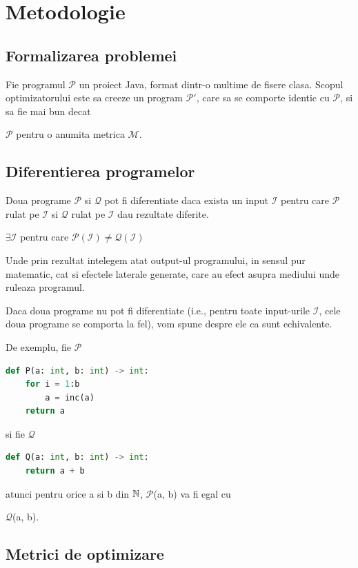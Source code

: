 \newcommand{\s}[1]{
    \(\mathcal{#1}\)}

\chapter{Metodologie}

\section{Formalizarea problemei}

Fie programul \s{P} un proiect Java, format dintr-o multime de fisere
clasa.  Scopul optimizatorului este sa creeze un program \s{P'}, care
sa se comporte identic cu \s{P}, si sa fie mai bun decat
\s{P} pentru o anumita metrica \s{M}.

\section{Diferentierea programelor}

Doua programe \s{P} si \s{Q} pot fi diferentiate daca
exista un input \s{I} pentru care \s{P} rulat pe \s{I}
si \s{Q} rulat pe \s{I} dau rezultate diferite.

\(\exists \mathcal{I}\) pentru care \(\mathcal{P}(\mathcal{I}) \ne
\mathcal{Q}(\mathcal{I}) \)

Unde prin rezultat intelegem atat output-ul programului, in
sensul pur matematic, cat si efectele laterale generate, care au
efect asupra mediului unde ruleaza programul.

Daca doua programe nu pot fi diferentiate (i.e., pentru toate
input-urile \s{I}, cele doua programe se comporta la fel), vom
spune despre ele ca sunt echivalente.

De exemplu, fie \s{P}

\begin{lstlisting}[language=Python,label={programul_p}]
def P(a: int, b: int) -> int:
    for i = 1:b
        a = inc(a)
    return a
\end{lstlisting}

si fie \s{Q}

\begin{lstlisting}[language=Python,label={programul_q}]
def Q(a: int, b: int) -> int:
    return a + b
\end{lstlisting}

atunci pentru orice a si b din $\mathbb{N}$, \s{P}(a, b) va fi egal cu
\s{Q}(a, b).

\section{Metrici de optimizare}

